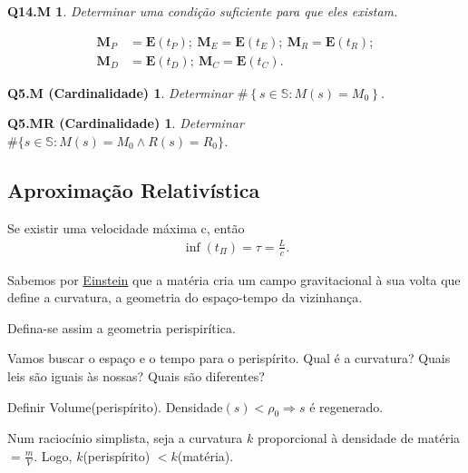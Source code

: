 \documentclass[12pt,a4paper]{article}
\begin{document}
			\newtheorem{Q14.M}{Q14.M}
			\begin{Q14.M} Determinar uma condi\c{c}\~ao suficiente para que eles existam.
			\end{Q14.M}

			\begin{align*}
				\mathbf{M}_P &= \mathbf{E}\left(t_P\right); \
				\mathbf{M}_E = \mathbf{E}\left(t_E\right); \
				\mathbf{M}_R = \mathbf{E}\left(t_R\right); \\
				\mathbf{M}_D &= \mathbf{E}\left(t_D\right); \
				\mathbf{M}_C = \mathbf{E}\left(t_C\right).
			\end{align*}

			\newtheorem{Q5.M}{Q5.M (Cardinalidade)}
			\begin{Q5.M} Determinar $ \#\left\{s \in \mathbb{S} : M(s) = M_0 \right\}$.
			\end{Q5.M}

			\newtheorem{Q5.MR}{Q5.MR (Cardinalidade)}
			\begin{Q5.MR} Determinar $ \#\{s \in \mathbb{S} : M(s) = M_0 \wedge R(s) = R_0 \}$.
			\end{Q5.MR}

		\subsection{Aproxima\c{c}\~ao Relativ\'istica}\label{relativistica}
			\begin{flushright}
			\end{flushright}

			Se existir uma velocidade m\'axima c, ent\~ao
			\begin{align*}
				\inf(t_\Pi) = \tau = \frac{L}{c}.
			\end{align*}

			Sabemos por \href{http://pt.wikipedia.org/wiki/Albert_Einstein}{Einstein} que a mat\'eria cria um campo gravitacional \`a sua volta que define a curvatura, a geometria do espa\c{c}o-tempo da vizinhan\c{c}a.

			Defina-se assim a geometria perispir\'itica.

			Vamos buscar o espa\c{c}o e o tempo para o perisp\'irito. Qual \'e a curvatura? Quais leis s\~ao iguais \`as nossas? Quais s\~ao diferentes?

			Definir Volume(perisp\'irito). Densidade$(s) < \rho_0 \Rightarrow s$ \'e regenerado.

			Num racioc\'inio simplista, seja a curvatura $k$ proporcional \`a densidade de mat\'eria $= \frac{m}{V}$. Logo, $k$(perisp\'irito) $< k$(mat\'eria).
\end{document}
